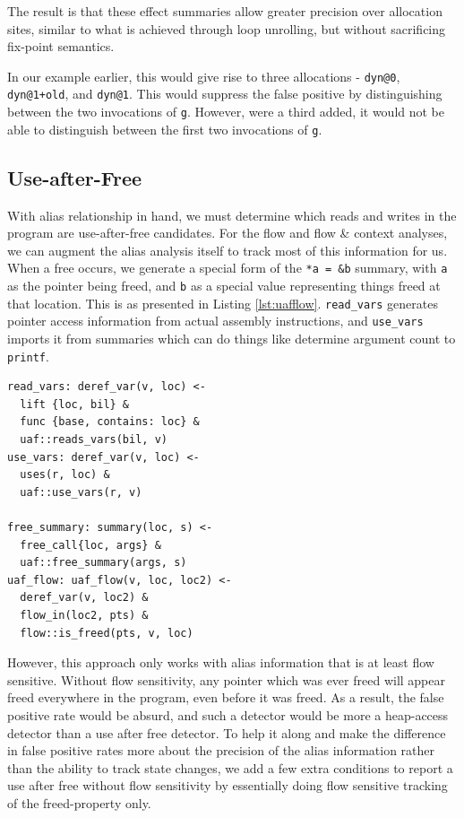 The result is that these effect summaries allow greater precision over allocation sites, similar to what is achieved through loop unrolling, but without sacrificing fix-point semantics.

In our example earlier, this would give rise to three allocations - \texttt{dyn@0}, \texttt{dyn@1+old}, and \texttt{dyn@1}.
This would suppress the false positive by distinguishing between the two invocations of \texttt{g}.
However, were a third added, it would not be able to distinguish between the first two invocations of \texttt{g}.

\subsection{Use-after-Free}
With alias relationship in hand, we must determine which reads and writes in the program are use-after-free candidates.
For the flow and flow \& context analyses, we can augment the alias analysis itself to track most of this information for us.
When a free occurs, we generate a special form of the \texttt{*a = \&b} summary, with \texttt{a} as the pointer being freed, and \texttt{b} as a special value representing things freed at that location.
This is as presented in Listing \ref{lst:uafflow}.
\texttt{read\_vars} generates pointer access information from actual assembly instructions, and \texttt{use\_vars} imports it from summaries which can do things like determine argument count to \texttt{printf}.

\begin{lstlisting}[label=lst:uafflow, caption={Tracking Frees with Flow Sensitivity}]
read_vars: deref_var(v, loc) <-
  lift {loc, bil} &
  func {base, contains: loc} &
  uaf::reads_vars(bil, v)
use_vars: deref_var(v, loc) <-
  uses(r, loc) &
  uaf::use_vars(r, v)

free_summary: summary(loc, s) <-
  free_call{loc, args} &
  uaf::free_summary(args, s)
uaf_flow: uaf_flow(v, loc, loc2) <-
  deref_var(v, loc2) &
  flow_in(loc2, pts) &
  flow::is_freed(pts, v, loc)
\end{lstlisting}

However, this approach only works with alias information that is at least flow sensitive.
Without flow sensitivity, any pointer which was ever freed will appear freed everywhere in the program, even before it was freed.
As a result, the false positive rate would be absurd, and such a detector would be more a heap-access detector than a use after free detector.
To help it along and make the difference in false positive rates more about the precision of the alias information rather than the ability to track state changes, we add a few extra conditions to report a use after free without flow sensitivity by essentially doing flow sensitive tracking of the freed-property only.


